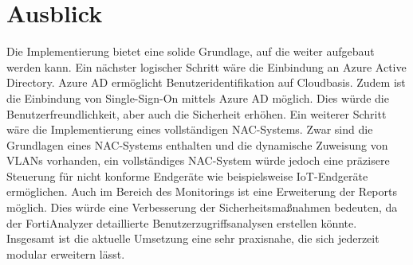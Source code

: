 \documentclass[lettersize,journal]{IEEEtran}
\begin{document}
\section{Ausblick}
Die Implementierung bietet eine solide Grundlage, auf die weiter aufgebaut werden kann. Ein nächster logischer Schritt wäre die Einbindung an Azure Active Directory. Azure AD ermöglicht Benutzeridentifikation auf Cloudbasis. Zudem ist die Einbindung von Single-Sign-On mittels Azure AD möglich. Dies würde die Benutzerfreundlichkeit, aber auch die Sicherheit erhöhen. Ein weiterer Schritt wäre die Implementierung eines vollständigen NAC-Systems. Zwar sind die Grundlagen eines NAC-Systems enthalten und die dynamische Zuweisung von VLANs vorhanden, ein vollständiges NAC-System würde jedoch eine präzisere Steuerung für nicht konforme Endgeräte wie beispielsweise IoT-Endgeräte ermöglichen. Auch im Bereich des Monitorings ist eine Erweiterung der Reports möglich. Dies würde eine Verbesserung der Sicherheitsmaßnahmen bedeuten, da der FortiAnalyzer detaillierte Benutzerzugriffsanalysen erstellen könnte. Insgesamt ist die aktuelle Umsetzung eine sehr praxisnahe, die sich jederzeit modular erweitern lässt.
\end{document}
